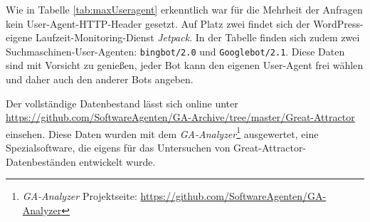 Wie in Tabelle \ref{tab:maxUseragent} erkenntlich war für die Mehrheit der
Anfragen kein User-Agent-HTTP-Header gesetzt. Auf Platz zwei findet sich der
WordPress-eigene Laufzeit-Monitoring-Dienst \emph{Jetpack}. In der Tabelle
finden sich zudem zwei Suchmaschinen-User-Agenten: \texttt{bingbot/2.0} und
\texttt{Googlebot/2.1}. Diese Daten sind mit Vorsicht zu genießen, jeder Bot
kann den eigenen User-Agent frei wählen und daher auch den anderer Bots angeben.

Der vollständige Datenbestand lässt sich online unter
\url{https://github.com/SoftwareAgenten/GA-Archive/tree/master/Great-Attractor}
einsehen. Diese Daten wurden mit dem
\emph{GA-Analyzer}\footnote{\emph{GA-Analyzer} Projektseite:
\url{https://github.com/SoftwareAgenten/GA-Analyzer}} ausgewertet, eine
Spezialsoftware, die eigens für das Untersuchen von
Great-Attractor-Datenbeständen entwickelt wurde.
